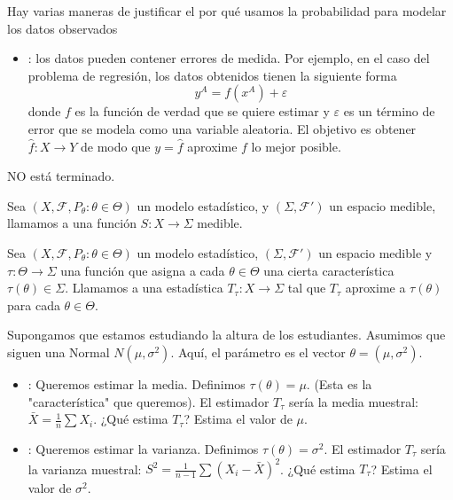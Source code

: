 \noindent
Hay varias maneras de justificar el por qué usamos la probabilidad para modelar los datos observados
\begin{itemize}
    \item {}: los datos pueden contener errores de medida. Por ejemplo, en el caso del problema de regresión, los datos obtenidos tienen la siguiente forma
    \begin{equation*}
        y^A = f(x^A) + \varepsilon
    \end{equation*}
    donde $f$ es la función de verdad que se quiere estimar y $\varepsilon$ es un término de error que se modela como una variable aleatoria. El objetivo es obtener $\hat{f}:X\to Y$ de modo que $y=\hat{f}$ aproxime $f$ lo mejor posible. \\
\end{itemize}
\noindent
NO está terminado.

\begin{definicion}[Statistica]
    Sea $(X,\mathcal{F},P_{\theta}:\theta \in \Theta)$ un modelo estadístico, y $(\Sigma, \mathcal{F}')$ un espacio medible, llamamos  a una función $S:X\to \Sigma$ medible.
\end{definicion}

\begin{definicion}[Stimatore]
    Sea $(X,\mathcal{F},P_{\theta}:\theta \in \Theta)$ un modelo estadístico, $(\Sigma, \mathcal{F}')$ un espacio medible y $\tau:\Theta \to \Sigma$ una función que asigna a cada $\theta\in \Theta$ una cierta característica $\tau(\theta)\in \Sigma$. Llamamos  a una estadística $T_{\tau}:X\to \Sigma$ tal que $T_{\tau}$ aproxime a $\tau(\theta)$ para cada $\theta \in \Theta$.
\end{definicion}

\begin{ejemplo}
    Supongamos que estamos estudiando la altura de los estudiantes. Asumimos que siguen una Normal $N(\mu, \sigma^2)$. Aquí, el parámetro es el vector $\theta = (\mu, \sigma^2)$.
    \begin{itemize}
        \item {}: Queremos estimar la media. Definimos $\tau(\theta) = \mu$. (Esta es la "característica" que queremos). El estimador $T_\tau$ sería la media muestral: $\bar{X} = \frac{1}{n}\sum X_i$. ¿Qué estima $T_\tau$? Estima el valor de $\mu$.
        \item {}: Queremos estimar la varianza. Definimos $\tau(\theta) = \sigma^2$. El estimador $T_\tau$ sería la varianza muestral: $S^2 = \frac{1}{n-1}\sum (X_i - \bar{X})^2$. ¿Qué estima $T_\tau$? Estima el valor de $\sigma^2$.
    \end{itemize}
\end{ejemplo}

